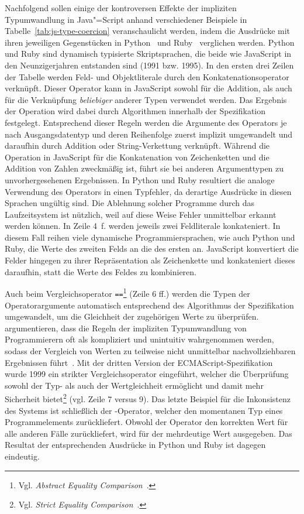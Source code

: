 Nachfolgend sollen einige der kontroversen Effekte der impliziten Typumwandlung in Java"=Script anhand verschiedener Beispiele in Tabelle~\ref{tab:js-type-coercion} veranschaulicht werden, indem die Ausdrücke mit ihren jeweiligen Gegenstücken in Python~\autocite{PYTHON3} und Ruby~\autocite{RUBY} verglichen werden. Python und Ruby sind dynamisch typisierte Skriptsprachen, die beide wie JavaScript in den Neunzigerjahren entstanden sind (1991 bzw. 1995).
In den ersten drei Zeilen der Tabelle werden Feld- und Objektliterale durch den Konkatenationsoperator \code{+} verknüpft. Dieser Operator kann in JavaScript sowohl für die Addition, als auch für die Verknüpfung \emph{beliebiger} anderer Typen verwendet werden. Das Ergebnis der Operation wird dabei durch Algorithmen innerhalb der Spezifikation~\autocite[220]{ECMASCRIPT:2019} festgelegt. Entsprechend dieser Regeln werden die Argumente des Operators je nach Ausgangsdatentyp und deren Reihenfolge zuerst implizit umgewandelt und daraufhin durch Addition oder String-Verkettung verknüpft. Während die Operation in JavaScript für die Konkatenation von Zeichenketten und die Addition von Zahlen zweckmäßig ist, führt sie bei anderen Argumenttypen zu unvorhergesehenen Ergebnissen. In Python und Ruby resultiert die analoge Verwendung des Operators in einen Typfehler, da derartige Ausdrücke in diesen Sprachen ungültig sind. Die Ablehnung solcher Programme durch das Laufzeitsystem ist nützlich, weil auf diese Weise Fehler unmittelbar erkannt werden können.
In Zeile 4~f. werden jeweils zwei Feldliterale konkateniert. In diesem Fall reihen viele dynamische Programmiersprachen, wie auch Python und Ruby, die Werte des zweiten Felds an die des ersten an. JavaScript konvertiert die Felder hingegen zu ihrer Repräsentation als Zeichenkette und konkateniert dieses daraufhin, statt die Werte des Feldes zu kombinieren.



Auch beim Vergleichsoperator \texttt{==}\footnote{Vgl. \textit{Abstract Equality Comparison}~\autocite[68]{ECMASCRIPT:2019}.} (Zeile 6 ff.) werden die Typen der Operatorargumente automatisch entsprechend des Algorithmus der Spezifikation umgewandelt, um die Gleichheit der zugehörigen Werte zu überprüfen. \citeauthor{PRADEL:2015} argumentieren, dass die Regeln der impliziten Typumwandlung von Programmierern oft als kompliziert und unintuitiv wahrgenommen werden, sodass der Vergleich von Werten zu teilweise nicht unmittelbar nachvollziehbaren Ergebnissen führt~\autocite{PRADEL:2015}.
Mit der dritten Version der ECMAScript-Spezifikation~\autocite{ECMASCRIPT:1999} wurde 1999 ein strikter Vergleichsoperator \code{===} eingeführt, welcher die Überprüfung sowohl der Typ- als auch der Wertgleichheit ermöglicht und damit mehr Sicherheit bietet\footnote{Vgl. \textit{Strict Equality Comparison}~\autocite[68]{ECMASCRIPT:2019}.} (vgl. Zeile 7 versus 9).
Das letzte Beispiel für die Inkonsistenz des Systems ist schließlich der -Operator, welcher den momentanen Typ eines Programmelements zurückliefert. Obwohl der Operator den korrekten Wert für alle anderen Fälle zurückliefert, wird für  der mehrdeutige Wert  ausgegeben. Das Resultat der entsprechenden Ausdrücke in Python und Ruby ist dagegen eindeutig.

